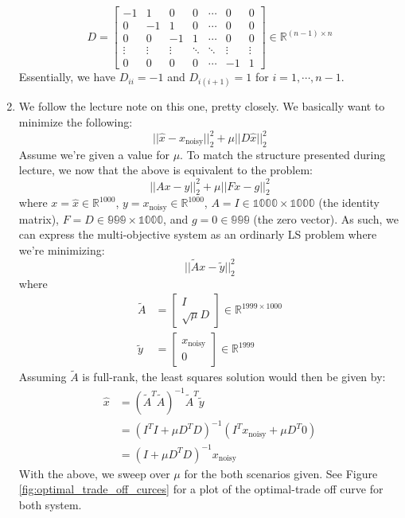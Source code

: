 \documentclass[12pt]{exam}
\begin{document}
\begin{questions}
\begin{solution}
\begin{enumerate}[label=(\alph*)]
\[      D =
        \begin{bmatrix}
          -1 & 1 & 0 & 0 & \cdots & 0 & 0 \\
          0 & -1 & 1 & 0 & \cdots & 0 & 0 \\
          0 & 0 & -1 & 1 & \cdots & 0 & 0 \\
          \vdots & \vdots & \vdots & \ddots & \ddots & \vdots & \vdots \\
          0 & 0 & 0 & 0  & \cdots & -1 & 1
        \end{bmatrix} \in \mathbb{R}^{(n-1) \times n}
    \]
    Essentially, we have $D_{ii} = -1$ and $D_{i(i+1)} = 1$ for $i = 1, \cdots, n - 1$.

    \item We follow the lecture note on this one, pretty closely. We basically want to minimize the following:
      \[
        || \hat{x} - x_{\text{noisy}}||_2^2 + \mu || D\hat{x} ||_2^2
      \]
      Assume we're given a value for $\mu$. To match the structure presented during lecture, we now that the above is equivalent to the problem:
      \[
        ||Ax - y||_2^2 + \mu ||Fx - g||_2^2
      \]
      where $x = \hat{x} \in \mathbb{R}^{1000}$, $y = x_{\text{noisy}} \in \mathbb{R}^{1000}$, $A = I \in \mathbb{1000 \times 1000}$ (the identity matrix), $F = D \in \mathbb{999 \times 1000}$, and $g = 0 \in \mathbb{999}$ (the zero vector). As such, we can express the multi-objective system as an ordinarly LS problem where we're minimizing:
      \[
        ||\tilde{A}x - \tilde{y}||_2^2
      \]
      where 
      \begin{align*}
        \tilde{A} &=
          \begin{bmatrix}
            I \\
            \sqrt{\mu}D
          \end{bmatrix} \in \mathbb{R}^{1999 \times 1000} \\
          \tilde{y} &= 
          \begin{bmatrix}
            x_{\text{noisy}} \\
            0
          \end{bmatrix} \in \mathbb{R}^{1999}
      \end{align*}
      Assuming $\tilde{A}$ is full-rank, the least squares solution would then be given by:
      \begin{align*}
        \hat{x} &= (\tilde{A}^T\tilde{A})^{-1}\tilde{A}^T\tilde{y} \\
        &= (I^TI + \mu D^TD)^{-1}(I^Tx_{\text{noisy}} + \mu D^T 0) \\
        &= (I + \mu D^TD)^{-1}x_{\text{noisy}}
      \end{align*}
      With the above, we sweep over $\mu$ for the both scenarios given. See Figure \ref{fig:optimal_trade_off_curces} for a plot of the optimal-trade off curve for both system.


\end{enumerate}
\end{solution}
\end{questions}
\end{document}
